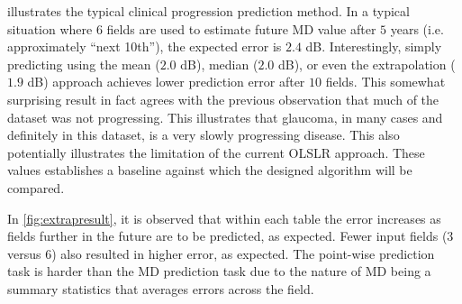  illustrates the typical clinical progression prediction method. In a typical situation where $6$ fields are used to estimate future MD value after $5$ years (i.e. approximately ``next 10th''), the expected error is $2.4$ dB. Interestingly, simply predicting using the mean ($2.0$ dB), median ($2.0$ dB), or even the extrapolation ($1.9$ dB) approach achieves lower prediction error after $10$ fields. This somewhat surprising result in fact agrees with the previous observation that much of the dataset was not progressing. This illustrates that glaucoma, in many cases and definitely in this dataset, is a very slowly progressing disease. This also potentially illustrates the limitation of the current \ac{OLSLR} approach. These values establishes a baseline against which the designed algorithm will be compared. 

In \cref{fig:extrapresult}, it is observed that within each table the error increases as fields further in the future are to be predicted, as expected. Fewer input fields ($3$ versus $6$) also resulted in higher error, as expected. The point-wise prediction task is harder than the MD prediction task due to the nature of MD being a summary statistics that averages errors across the field. 



